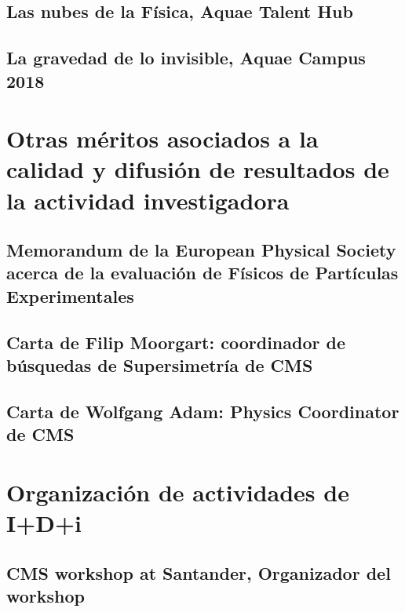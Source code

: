 \documentclass[a4paper, 11pt, twoside, openright]{report}
\begin{document}
\subsection{Las nubes de la Física, Aquae Talent Hub}


\subsection{La gravedad de lo invisible, Aquae Campus 2018} 




\section{Otras méritos asociados a la calidad y difusión de resultados de la actividad investigadora}
\subsection{Memorandum de la European Physical Society acerca de la evaluación de Físicos de Partículas Experimentales}

\subsection{Carta de Filip Moorgart: coordinador de búsquedas de Supersimetría de CMS}

\subsection{Carta de Wolfgang Adam: Physics Coordinator de CMS}




\section{Organización de actividades de I+D+i}
\subsection{CMS workshop at Santander, Organizador del workshop}

\end{document}
